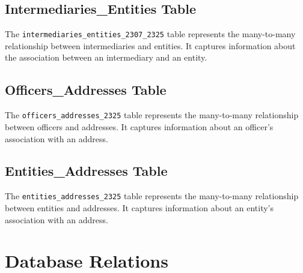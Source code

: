 \documentclass{article}
\begin{document}
\subsection*{Intermediaries\_Entities Table}
The \texttt{intermediaries\_entities\_2307\_2325} table represents the many-to-many relationship between intermediaries and entities. It captures information about the association between an intermediary and an entity.

\subsection*{Officers\_Addresses Table}
The \texttt{officers\_addresses\_2325} table represents the many-to-many relationship between officers and addresses. It captures information about an officer's association with an address.

\subsection*{Entities\_Addresses Table}
The \texttt{entities\_addresses\_2325} table represents the many-to-many relationship between entities and addresses. It captures information about an entity's association with an address.


\section*{\centering Database Relations}
\end{document}
